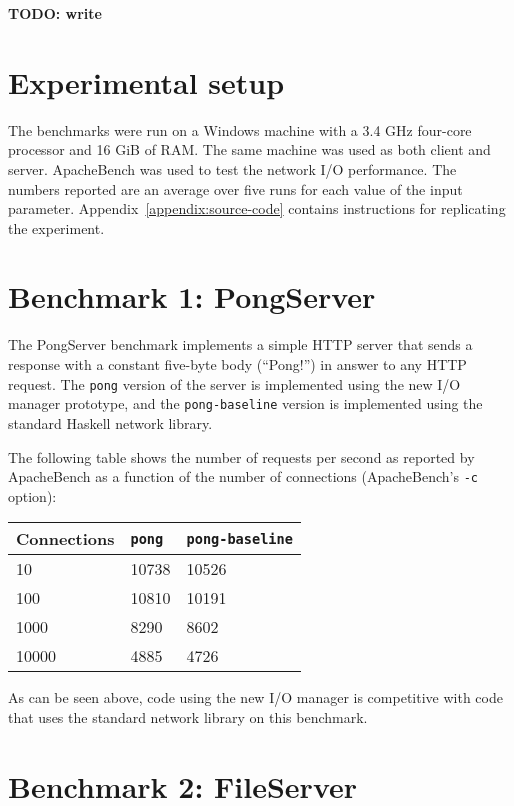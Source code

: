 \documentclass[a4paper,11pt,oneside]{report}
\begin{document}
\textbf{TODO: write}

\section{Experimental setup}

The benchmarks were run on a Windows machine with a 3.4 GHz four-core processor
and 16 GiB of RAM. The same machine was used as both client and
server. ApacheBench was used to test the network I/O performance. The numbers
reported are an average over five runs for each value of the input
parameter. Appendix~\ref{appendix:source-code} contains instructions for
replicating the experiment.

\section{Benchmark 1: PongServer}

The PongServer benchmark implements a simple HTTP server that sends a response
with a constant five-byte body (``Pong!'') in answer to any HTTP request. The
\texttt{pong} version of the server is implemented using the new I/O manager
prototype, and the \texttt{pong-baseline} version is implemented using the
standard Haskell network library.

The following table shows the number of requests per second as reported by
ApacheBench as a function of the number of connections (ApacheBench's
\texttt{-c} option):

\begin{center}
\begin{tabular}{ | l | l | l | }
  \hline
  Connections & \texttt{pong} & \texttt{pong-baseline} \\
  \hline
  10 & 10738 & 10526 \\
  \hline
  100 & 10810 & 10191 \\
  \hline
  1000 & 8290 & 8602 \\
  \hline
  10000 & 4885 & 4726 \\
  \hline
\end{tabular}
\end{center}

As can be seen above, code using the new I/O manager is competitive with code
that uses the standard network library on this benchmark.

\section{Benchmark 2: FileServer}
\end{document}
